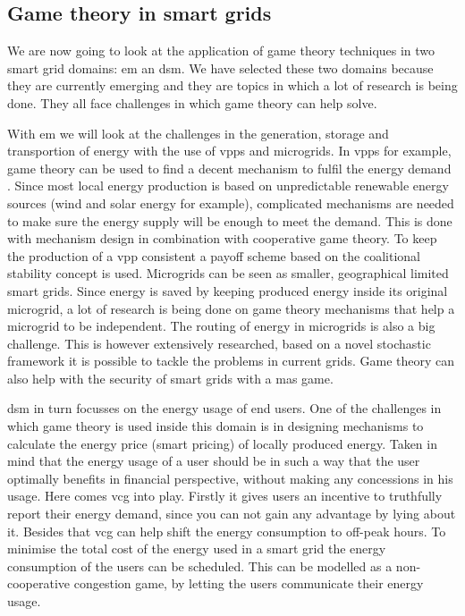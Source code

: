 \subsection{Game theory in smart grids}
We are now going to look at the application of game theory techniques in two smart grid domains: \ac{em} an \ac{dsm}. We have selected these two domains because they are currently emerging and they are topics in which a lot of research is being done. They all face challenges in which game theory can help solve. 

With \ac{em} we will look at the challenges in the generation, storage and transportion of energy with the use of \acp{vpp} and microgrids. 
In \acp{vpp} for example, game theory can be used to find a decent mechanism to fulfil the energy demand . Since most local energy production is based on unpredictable renewable energy sources (wind and solar energy for example), complicated mechanisms are needed to make sure the energy supply will be enough to meet the demand. This is done with mechanism design in combination with cooperative game theory. To keep the production of a \ac{vpp} consistent a payoff scheme based on the coalitional stability concept is used.
Microgrids can be seen as smaller, geographical limited smart grids. Since energy is saved by keeping produced energy inside its original microgrid, a lot of research is being done on game theory mechanisms that help a microgrid to be independent. 
The routing of energy in microgrids is also a big challenge. This is however extensively researched, based on a novel stochastic framework it is possible to tackle the problems in current grids. Game theory can also help with the security of smart grids with a \ac{mas} game. 

\ac{dsm} in turn focusses on the energy usage of end users. One of the challenges in which game theory is used inside this domain is in designing mechanisms to calculate the energy price (smart pricing) of locally produced energy. Taken in mind that the energy usage of a user should be in such a way that the user optimally benefits in financial perspective, without making any concessions in his usage. Here comes \ac{vcg} into play. Firstly it gives users an incentive to truthfully report their energy demand, since you can not gain any advantage by lying about it. Besides that \ac{vcg} can help shift the energy consumption to off-peak hours.  
To minimise the total cost of the energy used in a smart grid the energy consumption of the users can be scheduled. This can be modelled as a non-cooperative congestion game, by letting the users communicate their energy usage.